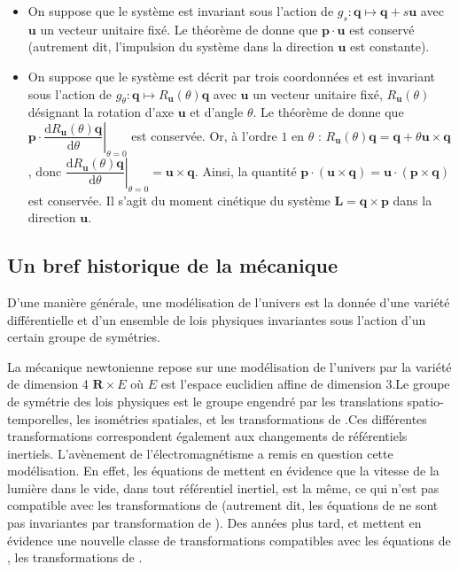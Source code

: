 \documentclass[12pt,a4paper]{article}
\theoremstyle{definition}
\begin{document}
\begin{itemize}
\item On suppose que le système est invariant sous l'action de $g_s:\mathbf{q}\mapsto\mathbf{q}+s\mathbf{u}$ avec $\mathbf{u}$ un vecteur unitaire fixé. Le théorème de  donne que $\mathbf{p}\cdot\mathbf{u}$ est conservé (autrement dit, l'impulsion du système dans la direction $\mathbf{u}$ est constante).
\item On suppose que le système est décrit par trois coordonnées et est invariant sous l'action de $g_\theta:\mathbf{q}\mapsto R_\mathbf{u}(\theta)\mathbf{q}$ avec $\mathbf{u}$ un vecteur unitaire fixé, $R_\mathbf{u}(\theta)$ désignant la rotation d'axe $\mathbf{u}$ et d'angle $\theta$. Le théorème de  donne que $\mathbf{p}\cdot\left.\dfrac{\mathrm{d}R_\mathbf{u}(\theta)\mathbf{q}}{\mathrm{d}\theta}\right|_{\theta=0}$ est conservée. Or, à l'ordre $1$ en $\theta$ : $R_\mathbf{u}(\theta)\mathbf{q}=\mathbf{q}+\theta\mathbf{u}\times\mathbf{q}$, donc $\left.\dfrac{\mathrm{d}R_\mathbf{u}(\theta)\mathbf{q}}{\mathrm{d}\theta}\right|_{\theta=0}=\mathbf{u}\times\mathbf{q}$. Ainsi, la quantité $\mathbf{p}\cdot (\mathbf{u}\times\mathbf{q})=\mathbf{u}\cdot(\mathbf{p}\times\mathbf{q})$ est conservée. Il s'agit du moment cinétique du système $\mathbf{L}=\mathbf{q}\times\mathbf{p}$ dans la direction $\mathbf{u}$.
\end{itemize}
\subsection{Un bref historique de la mécanique}
D'une manière générale, une modélisation de l'univers est la donnée d'une variété différentielle et d'un ensemble de lois physiques invariantes sous l'action d'un certain groupe de symétries.

\medskip

La mécanique newtonienne repose sur une modélisation de l'univers par la variété de dimension 4 $\mathbf{R}\times E$ où $E$ est l'espace euclidien affine de dimension $3$.\newline Le groupe de symétrie des lois physiques est le groupe engendré par les translations spatio-temporelles, les isométries spatiales, et les transformations de .\newline Ces différentes transformations correspondent également aux changements de référentiels inertiels. L'avènement de l'électromagnétisme a remis en question cette modélisation. En effet, les équations de  mettent en évidence que la vitesse de la lumière dans le vide, dans tout référentiel inertiel, est la même, ce qui n'est pas compatible avec les transformations de  (autrement dit, les équations de  ne sont pas invariantes par transformation de ). Des années plus tard,  et  mettent en évidence une nouvelle classe de transformations compatibles avec les équations de , les transformations de .
\end{document}

